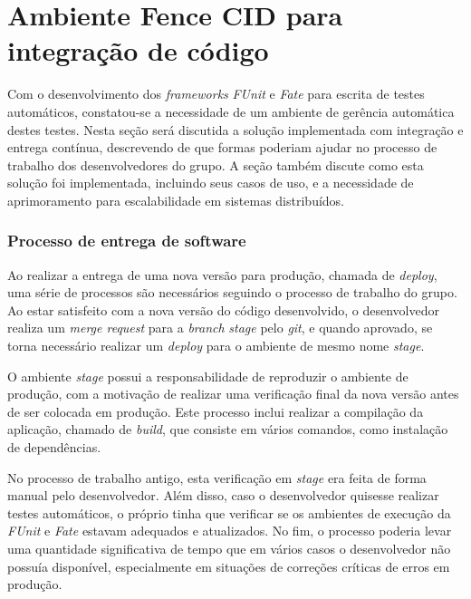 \hypertarget{fence-continuous-integration-delivery}{%
\section{Ambiente Fence CID para integração de código}\label{fence-continuous-integration-delivery}}

 Com o desenvolvimento dos \emph{frameworks} \emph{FUnit} e \emph{Fate} para escrita de testes automáticos, constatou-se a necessidade de um ambiente de gerência automática destes testes. Nesta seção será discutida a solução implementada com integração e entrega contínua, descrevendo de que formas poderiam ajudar no processo de trabalho dos desenvolvedores do grupo. A seção também discute como esta solução foi implementada, incluindo seus casos de uso, e a necessidade de aprimoramento para escalabilidade em sistemas distribuídos.

\hypertarget{processo-de-entrega-de-software}{%
\subsubsection{\texorpdfstring{Processo de entrega de software}{Processo de entrega de software}}\label{processo-de-entrega-de-software}}

Ao realizar a entrega de uma nova versão para produção, chamada de \emph{deploy}, uma série de processos são necessários seguindo o processo de trabalho do grupo. Ao estar satisfeito com a nova versão do código desenvolvido, o desenvolvedor realiza um \emph{merge request} para a \emph{branch} \emph{stage} pelo \emph{git}, e quando aprovado, se torna necessário realizar um \emph{deploy} para o ambiente de mesmo nome \emph{stage}. 

O ambiente \emph{stage} possui a responsabilidade de reproduzir o ambiente de produção, com a motivação de realizar uma verificação final da nova versão antes de ser colocada em produção. Este processo inclui realizar a compilação da aplicação, chamado de \emph{build}, que consiste em vários comandos, como instalação de dependências.

No processo de trabalho antigo, esta verificação em \emph{stage} era feita de forma manual pelo desenvolvedor. Além disso, caso o desenvolvedor quisesse realizar testes automáticos, o próprio tinha que verificar se os ambientes de execução da \emph{FUnit} e \emph{Fate} estavam adequados e atualizados. No fim, o processo poderia levar uma quantidade significativa de tempo que em vários casos o desenvolvedor não possuía disponível, especialmente em situações de correções críticas de erros em produção.


